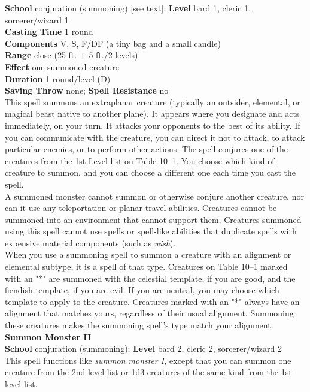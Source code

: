 \textbf{School} conjuration (summoning) [see text]; \textbf{Level} bard 1, cleric 1, sorcerer/wizard 1\\
\textbf{Casting Time} 1 round\\
\textbf{Components} V, S, F/DF (a tiny bag and a small candle)\\
\textbf{Range} close (25 ft. + 5 ft./2 levels)\\
\textbf{Effect} one summoned creature\\
\textbf{Duration} 1 round/level (D)\\
\textbf{Saving Throw} none; \textbf{Spell Resistance} no\\
This spell summons an extraplanar creature (typically an outsider, elemental, or magical beast native to another plane). It appears where you designate and acts immediately, on your turn. It attacks your opponents to the best of its ability. If you can communicate with the creature, you can direct it not to attack, to attack particular enemies, or to perform other actions. The spell conjures one of the creatures from the 1st Level list on Table 10–1. You choose which kind of creature to summon, and you can choose a different one each time you cast the spell.\\
A summoned monster cannot summon or otherwise conjure another creature, nor can it use any teleportation or planar travel abilities. Creatures cannot be summoned into an environment that cannot support them. Creatures summoned using this spell cannot use spells or spell-like abilities that duplicate spells with expensive material components (such as \textit{wish}).\\
When you use a summoning spell to summon a creature with an alignment or elemental subtype, it is a spell of that type. Creatures on Table 10–1 marked with an "*" are summoned with the celestial template, if you are good, and the fiendish template, if you are evil. If you are neutral, you may choose which template to apply to the creature. Creatures marked with an "*" always have an alignment that matches yours, regardless of their usual alignment. Summoning these creatures makes the summoning spell's type match your alignment.\\
\textbf{Summon Monster II}\\
\textbf{School} conjuration (summoning); \textbf{Level} bard 2, cleric 2, sorcerer/wizard 2\\
This spell functions like \textit{summon monster I, }except that you can summon one creature from the 2nd-level list or 1d3 creatures of the same kind from the 1st-level list.\\
